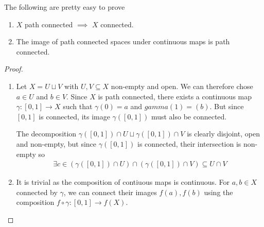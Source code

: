 \begin{rem}
  The following are pretty easy to prove
  \begin{enumerate}
    \item $X$ path connected $\implies$ $X$ connected. 
    \item The image of path connected spaces under continuous maps is path connected.
  \end{enumerate}
\end{rem}
\begin{proof}
\begin{enumerate}
  \item Let $X = U \sqcup V$ with $U,V \subseteq X$ non-empty and open. We can therefore chose $a \in U$ and $b \in V$. Since $X$ is path connected, there exists a continuous map $\gamma: [0,1] \to  X$ such that $\gamma(0) = a$ and $gamma(1) = (b)$.
    But since $[0,1]$ is connected, its image $\gamma([0,1])$ must also be connected.

    The decomposition $\gamma([0,1]) \cap U \sqcup \gamma([0,1]) \cap V$ is clearly disjoint, open and non-empty, but since $\gamma([0,1])$ is connected, their intersection is non-empty so
    \begin{align*}
      \exists c \in (\gamma([0,1]) \cap U) \cap (\gamma([0,1]) \cap V) \subseteq U \cap V
    \end{align*}
  \item It is trivial as the composition of contiuous maps is continuous. For $a,b \in X$ connected by $\gamma$, we can connect their images $f(a), f(b)$ using the composition $f \circ \gamma: [0,1] \to f(X)$.
\end{enumerate}
\end{proof}

